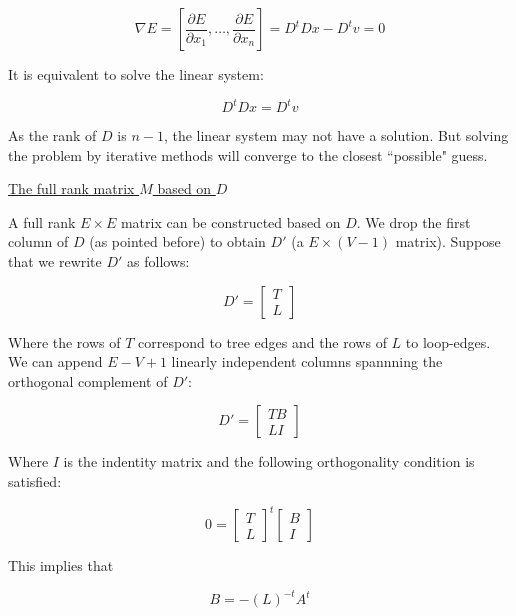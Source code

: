\documentclass[a4paper,11pt]{article}
\begin{document}
$$\nabla E = [\frac{\partial E}{\partial x_1}, \dots, \frac{\partial 
E}{\partial x_n}] = D^tDx-D^tv=0$$

It is equivalent to solve the linear system:

$$D^tDx = D^tv$$

As the rank of $D$ is $n-1$, the linear system may not have a solution. 
But solving the problem by iterative methods will converge to the 
closest ``possible" guess.

\bigskip

\underline{The full rank matrix $M$ based on $D$}

\bigskip

A full rank $E \times E$ matrix can be constructed based on $D$. We 
drop the first column of $D$ (as pointed before) to obtain $D'$ (a $E 
\times (V-1)$ matrix). Suppose that we rewrite $D'$ as follows:

\begin{equation}
     D'=\begin{bmatrix}
         T \\
         L
	\end{bmatrix}
 \end{equation}

Where the rows of $T$ correspond to tree edges and the rows of $L$ to 
loop-edges. We can append $E-V+1$ linearly independent columns 
spannning the orthogonal complement of $D'$:

\begin{equation}
     D'=\begin{bmatrix}
         T B\\
         L I
	\end{bmatrix}
\end{equation}

Where $I$ is the indentity matrix and the following orthogonality 
condition is satisfied: 

\begin{equation}
     0=\begin{bmatrix}
         T \\
         L
	\end{bmatrix}^t
	\begin{bmatrix}
         B\\
         I
	\end{bmatrix}
\end{equation}

This implies that

$$B = -(L)^{-t}A^t$$
\end{document}
